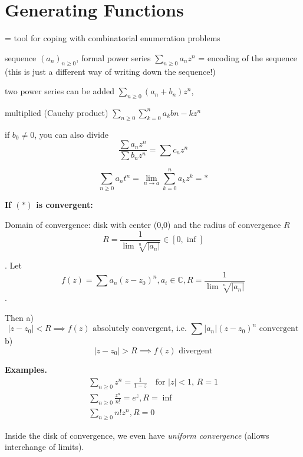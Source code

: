 

\section{Generating Functions}

= tool for coping with combinatorial enumeration problems

sequence $(a_n)_{n≥0}$,
formal power series $\sum_{n≥0} a_n z^n$ = encoding of the sequence
(this is just a different way of writing down the sequence!)

two power series can be added
$\sum_{n≥0} (a_n + b_n) z^n$,

multiplied (Cauchy product)
$\sum_{n≥0}\sum_{k=0}^n a_k b{n-k} z^n$

if $b_0 ≠ 0$, you can also divide
\[
    \frac{
        \sum a_n z^n
    }{
        \sum b_n z^n
    } =
        \sum c_n z^n
\]

\[
    \sum_{n≥0} a_n t^n
    = \lim_{n \to a} \sum_{k=0}^{n} a_k z^k = *
\]

\textbf{If $(*)$ is convergent:}

Domain of convergence: disk with center (0,0) and the radius of convergence $R$
\[
    R = \frac1{\lim \sqrt[n]{|a_n|}}
    \in [0, \inf]
\]

\Theorem.
Let
\[
    f(z) = \sum a_n (z-z_0)^n,
    a_i\in \mathbb{C},
    R = \frac{1}{\lim \sqrt[n]{|a_n|}}
\].

Then
a)
\[
    |z - z_0| < R \implies
    \text{$f(z)$ absolutely convergent,
    i.e.
    $\sum |a_n| (z-z_0)^n$ convergent}
\]
b)
\[
    |z - z_0| > R \implies \text{$f(z)$ divergent}
\]

\textbf{Examples.}
\begin{gather*}
    \sum_{n≥0} z^n =
        \frac1{1-z}\quad\text{for $|z|<1$, } R = 1 \\
    \sum_{n≥0} \frac{z^n}{n!} =
        e^z, R = \inf \\
    \sum_{n≥0} n! z^n, R = 0
\end{gather*}

Inside the disk of convergence, we even have \emph{uniform convergence} (allows interchange of limits).


